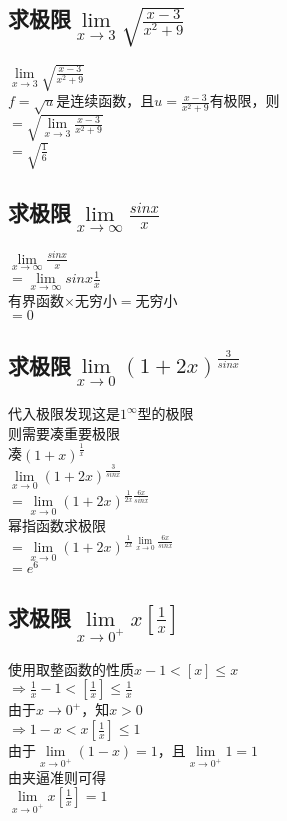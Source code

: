 \documentclass{article}
\begin{document}
\begin{flushleft}
\subsection{
	求极限$\lim\limits_{x\to 3}\sqrt{\frac{x-3}{x^2+9}}$
}
$\lim\limits_{x\to 3}\sqrt{\frac{x-3}{x^2+9}}$\\
$f=\sqrt{u}$是连续函数，且$u=\frac{x-3}{x^2+9}$有极限，则\\
$=\sqrt{\lim\limits_{x\to 3}\frac{x-3}{x^2+9}}$\\
$=\sqrt{\frac{1}{6}}$\\

\subsection{
	求极限$\lim\limits_{x\to \infty}\frac{sinx}{x}$
}
$\lim\limits_{x\to \infty}\frac{sinx}{x}$\\
$=\lim\limits_{x\to \infty}sinx\frac{1}{x}$\\
有界函数$\times$无穷小$=$无穷小\\
$=0$\\

\subsection{
求极限$\lim\limits_{x\to 0}(1+2x)^{\frac{3}{sinx}}$
}
代入极限发现这是$1^\infty$型的极限\\
则需要凑重要极限\\
凑$(1+x)^{\frac{1}{x}}$\\
$\lim\limits_{x\to 0}(1+2x)^{\frac{3}{sinx}}$\\
$=\lim\limits_{x\to 0}(1+2x)^{\frac{1}{2x}\frac{6x}{sinx}}$\\
幂指函数求极限\\
$=\lim\limits_{x\to 0}(1+2x)^{\frac{1}{2x}\lim\limits_{x\to 0}\frac{6x}{sinx}}$\\
$=e^6$\\

\subsection{
	求极限$\lim\limits_{x\to 0^+}x[\frac{1}{x}]$
}
使用取整函数的性质$x-1<[x]\le x$\\
$\Rightarrow \frac{1}{x}-1<[\frac{1}{x}]\le \frac{1}{x}$\\
由于$x\to 0^+$，知$x>0$\\
$\Rightarrow 1-x<x[\frac{1}{x}]\le 1$\\
由于$\lim\limits_{x\to 0^+}(1-x)=1$，且$\lim\limits_{x\to 0^+}1=1$\\
由夹逼准则可得\\
$\lim\limits_{x\to 0^+}x[\frac{1}{x}]=1$\\


\end{flushleft}
\end{document}
